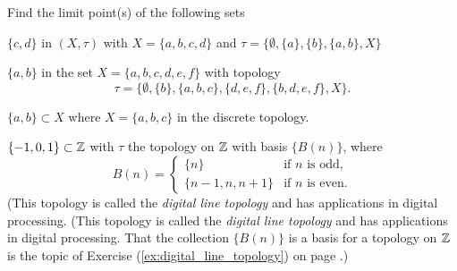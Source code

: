 \begin{activity} Find the limit point(s) of the following sets
\ba
\item $\{c,d\}$ in $(X, \tau)$ with $X= \{a,b,c,d\}$ and $\tau = \{\emptyset, \{a\}, \{b\}, \{a,b\}, X \}$

\item $\{a,b\}$ in the set $X= \{a,b,c,d,e,f\}$ with topology 
\[\tau= \{\emptyset,\{b\}, \{a,b,c\},\{d,e,f\},\{b,d,e,f\}, X\}.\] 

\item $\{a,b\} \subset X$ where $X = \{a,b,c\}$ in the discrete topology. 

\item $\{-1,0,1\} \subset \mathbb{Z}$ with $\tau$ the topology on $\mathbb{Z}$ with basis $\{B(n)\}$, where 
\[B(n) = \begin{cases} \{n\}	&\text{if $n$ is odd}, \\ \{n-1,n,n+1\}	&\text{if $n$ is even}. \end{cases}\]
(This topology is called the \emph{digital line topology} and has applications in digital processing. (This topology is called the \emph{digital line topology} and has applications in digital processing. That the collection $\{B(n)\}$ is a basis for a topology on $\mathbb{Z}$ is the topic of Exercise (\ref{ex:digital_line_topology}) on page \pageref{ex:digital_line_topology}.)
 
 \ea

\end{activity}

